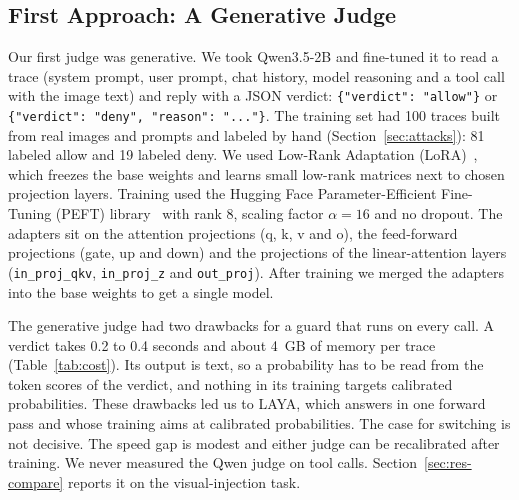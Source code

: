 \documentclass[sigconf,nonacm]{acmart}
\begin{document}
\subsection{First Approach: A Generative Judge}\label{sec:qwen}
Our first judge was generative. We took Qwen3.5-2B and fine-tuned it to read a trace (system prompt, user prompt, chat history, model reasoning and a tool call with the image text) and reply with a JSON verdict: \texttt{\{"verdict": "allow"\}} or \texttt{\{"verdict": "deny", "reason": "..."\}}. The training set had 100 traces built from real images and prompts and labeled by hand (Section~\ref{sec:attacks}): 81 labeled allow and 19 labeled deny. We used Low-Rank Adaptation (LoRA)~\cite{hu2022lora}, which freezes the base weights and learns small low-rank matrices next to chosen projection layers. Training used the Hugging Face Parameter-Efficient Fine-Tuning (PEFT) library~\cite{peft} with rank 8, scaling factor $\alpha=16$ and no dropout. The adapters sit on the attention projections (q, k, v and o), the feed-forward projections (gate, up and down) and the projections of the linear-attention layers (\texttt{in\_proj\_qkv}, \texttt{in\_proj\_z} and \texttt{out\_proj}). After training we merged the adapters into the base weights to get a single model.

The generative judge had two drawbacks for a guard that runs on every call. A verdict takes 0.2 to 0.4 seconds and about 4~GB of memory per trace (Table~\ref{tab:cost}). Its output is text, so a probability has to be read from the token scores of the verdict, and nothing in its training targets calibrated probabilities. These drawbacks led us to LAYA, which answers in one forward pass and whose training aims at calibrated probabilities. The case for switching is not decisive. The speed gap is modest and either judge can be recalibrated after training. We never measured the Qwen judge on tool calls. Section~\ref{sec:res-compare} reports it on the visual-injection task.
\end{document}
